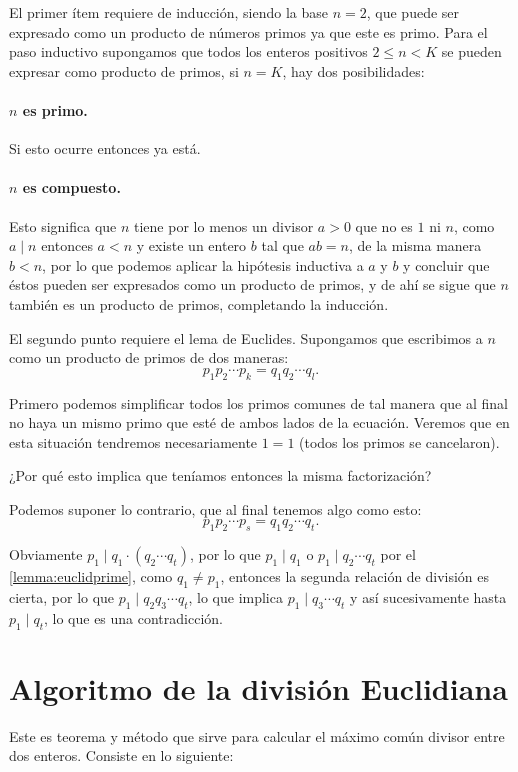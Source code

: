 El primer ítem requiere de inducción,
siendo la base $n = 2$,
que puede ser expresado como
un producto de números primos ya que este es primo.
Para el paso inductivo supongamos que
todos los enteros positivos $2 \leq n < K$
se pueden expresar como producto de primos,
si $n = K$, hay dos posibilidades:

\paragraph{$n$ es primo. } Si esto ocurre entonces
ya está.

\paragraph{$n$ es compuesto. } Esto significa que
$n$ tiene por lo menos un divisor $a > 0$ que no es $1$ ni $n$,
como $a \mid n$ entonces $a < n$ y existe un
entero $b$ tal que $ab = n$, de la misma manera $b < n$,
por lo que podemos aplicar la hipótesis inductiva a $a$
y $b$ y concluir que éstos pueden ser expresados
como un producto de primos, y de ahí se sigue que $n$
también es un producto de primos, completando
la inducción.

El segundo punto requiere el lema de Euclides.
Supongamos que escribimos a $n$
como un producto de primos de dos maneras:
\[p_1p_2 \cdots p_k = q_1q_2 \cdots q_l.\]

Primero podemos simplificar todos los primos
comunes de tal manera que al final no haya un mismo primo que
esté de ambos lados de la ecuación.
Veremos que en esta situación tendremos
necesariamente $1 = 1$ (todos los primos se
cancelaron).
\begin{question*}
	¿Por qué esto implica que teníamos
	entonces la misma factorización?
\end{question*}

Podemos suponer lo contrario,
que al final tenemos algo como esto:
\[p_1p_2\cdots p_s = q_1q_2\cdots q_t.\]

Obviamente $p_1 \mid q_1 \cdot (q_2\cdots q_t)$,
por lo que $p_1 \mid q_1$ o $p_1 \mid q_2\cdots q_t$
por el \autoref{lemma:euclidprime},
como $q_1 \neq p_1$, entonces
la segunda relación de división es cierta,
por lo que $p_1 \mid q_2q_3 \cdots q_t$,
lo que implica $p_1 \mid q_3\cdots q_t$
y así sucesivamente hasta $p_1 \mid q_t$,
lo que es una contradicción.

\section{Algoritmo de la división Euclidiana}
Este es teorema y método que sirve
para calcular el máximo común divisor
entre dos enteros. Consiste en lo siguiente:

